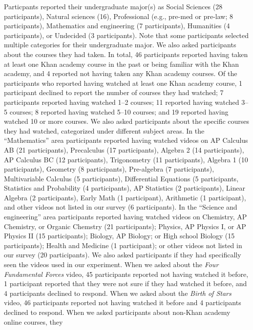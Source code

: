 \documentclass[10pt]{article}
\begin{document}
Particpants reported their undergraduate major(s) as Social Sciences
(28 participants), Natural sciences (16), Professional (e.g., pre-med
or pre-law; 8 participants), Mathematics and engineering (7
participants), Humanities (4 participants), or Undecided (3
participants).  Note that some participants selected multiple
categories for their undergraduate major.  We also asked participants
about the courses they had taken.  In total, 46 participants reported
having taken at least one Khan academy course in the past or being
familiar with the Khan academy, and 4 reported not having taken any
Khan academy courses.  Of the participants who reported having watched
at least one Khan academy course, 1 participant declined to report the
number of courses they had watched; 7 participants reported having
watched 1--2 courses; 11 reported having watched 3--5 courses; 8
reported having watched 5--10 courses; and 19 reported having watched
10 or more courses.  We also asked participants about the specific
courses they had watched, categorized under different subject areas.
In the ``Mathematics'' area participants reported having watched
videos on AP Calculus AB (21 participants), Precalculus (17
participants), Algebra 2 (14 participants), AP Calculus BC (12
participants), Trigonometry (11 participants), Algebra 1 (10
participants), Geometry (8 participants), Pre-algebra (7
participants), Multivariable Calculus (5 participants), Differential
Equations (5 participants, Statistics and Probability (4
participants), AP Statistics (2 participants), Linear Algebra (2
participants), Early Math (1 participant), Arithmetic (1 participant),
and other videos not listed in our survey (6 participants).  In the ``Science and engineering''
area participants reported having watched videos on Chemistry, AP
Chemistry, or Organic Chemstry (21
participants); Physics, AP Physics I, or AP Physics II (15 participants); Biology, AP
Biology; or High school Biology (15 participants); Health and Medicine
(1 participant); or other videos not listed in our survey (20 participants).  We also asked
participants if they had specifically seen the videos used in our
experiment.  When we asked about the \textit{Four Fundamental Forces}
video, 45 participants reported not having watched it before, 1
participant reported that they were not sure if they had watched it
before, and 4 participants declined to respond.  When we asked about
the \textit{Birth of Stars} video, 46 participants reported not having
watched it before and 4 participants declined to respond.  When we
asked participants about non-Khan academy online courses, they
\end{document}
